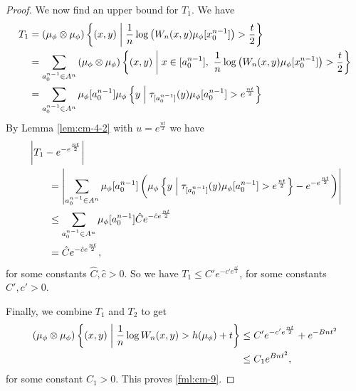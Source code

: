 \begin{theorem}
\begin{proof}
		We now find an upper bound for $T_1$. We have
		\begin{align*}
			T_1 &= (\mu_\phi \otimes \mu_\phi)\left\{(x, y) \midmid \frac{1}{n}\log\left(W_n(x, y) \mu_\phi[x_0^{n - 1}]\right) > \frac{t}{2}\right\} \\
				&= \sum_{a_0^{n - 1} \in A^n}{(\mu_\phi \otimes \mu_\phi)\left\{(x, y) \midmid x \in [a_0^{n - 1}],\ \frac{1}{n}\log\left(W_n(x, y) \mu_\phi[x_0^{n - 1}]\right) > \frac{t}{2}\right\}} \\
				&= \sum_{a_0^{n - 1} \in A^n}{\mu_\phi[a_0^{n - 1}] \mu_\phi\left\{y \midmid \tau_{[a_0^{n - 1}]}(y) \mu_\phi[a_0^{n - 1}] > e^\frac{nt}{2}\right\}}
		\end{align*}
		By Lemma \ref{lem:cm-4-2} with $u = e^\frac{nt}{2}$ we have
		\begin{align*}
			&\left|T_1 - e^{-e^\frac{nt}{2}}\right| \\
				& \qquad = \left|\sum_{a_0^{n - 1} \in A^n}\mu_\phi[a_0^{n - 1}]\left(\mu_\phi\left\{y \mathrel{}\middle|\mathrel{} \tau_{[a_0^{n - 1}]}(y) \mu_\phi[a_0^{n - 1}] > e^\frac{nt}{2}\right\} - e^{-e^\frac{nt}{2}}\right)\right| \\
				& \qquad \leq \sum_{a_0^{n - 1} \in A^n}\mu_\phi[a_0^{n - 1}] \hat{C}e^{-\hat{c}e^\frac{nt}{2}} \\
				& \qquad = \hat{C}e^{-\hat{c}e^\frac{nt}{2}},
		\end{align*}
		for some constants $\hat{C}, \hat{c} > 0$. So we have $T_1 \leq C'e^{-c'e^\frac{nt}{2}}$, for some constants $C', c' > 0$.
		
		Finally, we combine $T_1$ and $T_2$ to get
		\begin{align*}
			(\mu_\phi \otimes \mu_\phi)\left\{(x, y) \mathrel{}\middle|\mathrel{} \frac{1}{n}\log{W_n(x, y)} > h(\mu_\phi) + t\right\} &\leq C'e^{-c'e^\frac{nt}{2}} + e^{-Bnt^2} \\
				& \leq C_1 e^{Bnt^2},
		\end{align*}
		for some constant $C_1 > 0$. This proves \eqref{fml:cm-9}.
		

\end{proof}
\end{theorem}
